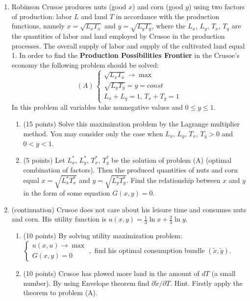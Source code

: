 \documentclass[A4,12pt]{article}
\begin{document}
\begin{enumerate}[resume]
\item Robinson Crusoe produces nuts (good $x$) and corn (good $y$) using two factors of production: labor $L$ and land $T$ in accordance with the production functions, namely $x=\sqrt{L_x T_x}$ and $y=\sqrt{L_y T_y}$, where the $L_x$, $L_y$, $T_x$, $T_y$ are the quantities of labor and land employed by Crusoe in the production processes. The overall supply of labor and supply of the cultivated land equal 1. In order to find the \textbf{Production Possibilities Frontier} in the Crusoe’s economy the following problem should be solved:
\[
(A)\,
\begin{cases}
	\sqrt{L_x T_x} \to \max \\
	\sqrt{L_y T_y}=y=const \\
	L_x + L_y = 1, \, T_x + T_y = 1
\end{cases}
\]
In this problem all variables take nonnegative values and $0\leq y\leq 1$.

\begin{enumerate}
\item (15 points) Solve this maximization problem by the Lagrange multiplier method. You may consider only the case when $L_x,\, L_y,\, T_x, \, T_y>0$  and $0<y<1$.
\item (5 points) Let $L_x^*$, $L_y^*$, $T_x^*$, $T_y^*$ be the solution of problem (A) (optimal combination of factors). Then the produced quantities of nuts and corn equal $x=\sqrt{L_x^* T_x^*}$ and $y=\sqrt{L_y^* T_y^*}$. Find the relationship between $x$ and $y$ in the form of some equation $G(x,y)=0$.
\end{enumerate}

\item (continuation) Crusoe does not care about his leisure time and consumes nuts and corn. His utility function is $u(x,y)=\frac{1}{3}\ln x + \frac{2}{3}\ln y$. 

\begin{enumerate}
\item (10 points) By solving utility maximization problem: 
$
\begin{cases}
u(x,u) \to \max \\
G(x,y)=0
\end{cases},
$ find his optimal consumption bundle $(\tilde{x},\tilde{y})$.
\item (10 points) Crusoe has plowed more land in the amount of $dT$ (a small number). By using Envelope theorem find $\partial \tilde{x}/\partial T$. Hint. Firstly apply the theorem to problem (A).
\end{enumerate}

\end{enumerate}
\end{document}
